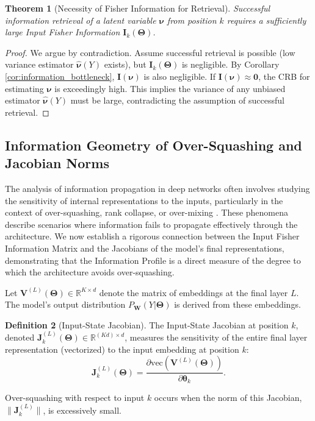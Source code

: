 \documentclass{article}
\newtheorem{theorem}{Theorem}[section]
\theoremstyle{definition}
\newtheorem{definition}[theorem]{Definition}
\begin{document}
\begin{theorem}[Necessity of Fisher Information for Retrieval]
Successful information retrieval of a latent variable $\boldsymbol{\nu}$ from position $k$ requires a sufficiently large Input Fisher Information $\mathbf{I}_k(\mathbf{\Theta})$.
\end{theorem}
\begin{proof}
We argue by contradiction. Assume successful retrieval is possible (low variance estimator $\hat{\boldsymbol{\nu}}(Y)$ exists), but $\mathbf{I}_k(\mathbf{\Theta})$ is negligible. By Corollary \ref{cor:information_bottleneck}, $\mathbf{I}(\boldsymbol{\nu})$ is also negligible. If $\mathbf{I}(\boldsymbol{\nu}) \approx \mathbf{0}$, the CRB for estimating $\boldsymbol{\nu}$ is exceedingly high. This implies the variance of any unbiased estimator $\hat{\boldsymbol{\nu}}(Y)$ must be large, contradicting the assumption of successful retrieval.
\end{proof}

\subsection{Information Geometry of Over-Squashing and Jacobian Norms}

The analysis of information propagation in deep networks often involves studying the sensitivity of internal representations to the inputs, particularly in the context of over-squashing, rank collapse, or over-mixing \cite{barbero2024transformers, dong2021attention}. These phenomena describe scenarios where information fails to propagate effectively through the architecture. We now establish a rigorous connection between the Input Fisher Information Matrix and the Jacobians of the model's final representations, demonstrating that the Information Profile is a direct measure of the degree to which the architecture avoids over-squashing.

Let $\mathbf{V}^{(L)}(\mathbf{\Theta}) \in \mathbb{R}^{K \times d}$ denote the matrix of embeddings at the final layer $L$. The model's output distribution $P_{\mathbf{W}}(Y|\mathbf{\Theta})$ is derived from these embeddings.

\begin{definition}[Input-State Jacobian]
The Input-State Jacobian at position $k$, denoted $\mathbf{J}_k^{(L)}(\mathbf{\Theta}) \in \mathbb{R}^{(Kd) \times d}$, measures the sensitivity of the entire final layer representation (vectorized) to the input embedding at position $k$:
\begin{equation}
    \mathbf{J}_k^{(L)}(\mathbf{\Theta}) = \frac{\partial \text{vec}(\mathbf{V}^{(L)}(\mathbf{\Theta}))}{\partial \boldsymbol{\theta}_k}.
\end{equation}
\end{definition}
Over-squashing with respect to input $k$ occurs when the norm of this Jacobian, $\|\mathbf{J}_k^{(L)}\|$, is excessively small.
\end{document}
